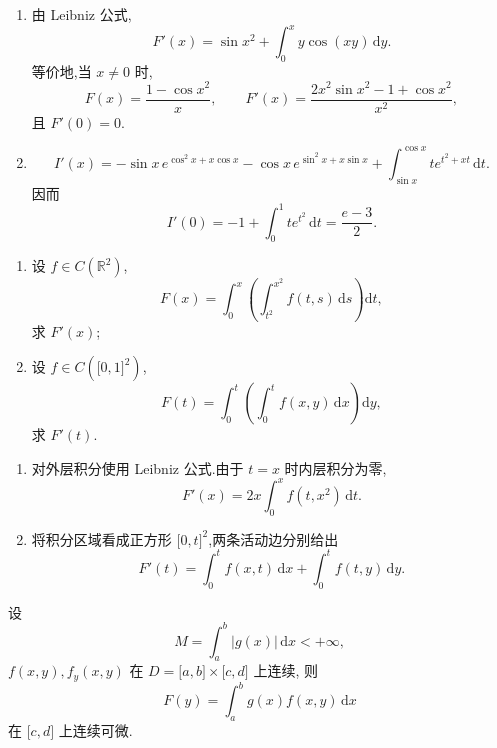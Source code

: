 \begin{solution}
    \begin{enumerate}
        \item 由 Leibniz 公式,
              \[
                  F'(x)=\sin x^2+\int_0^x y\cos(xy)\,\mathrm{d}y.
              \]
              等价地,当 $x\neq0$ 时,
              \[
                  F(x)=\dfrac{1-\cos x^2}{x},
                  \qquad
                  F'(x)=\dfrac{2x^2\sin x^2-1+\cos x^2}{x^2},
              \]
              且 $F'(0)=0$.
        \item
              \[
                  I'(x)=-\sin x\,e^{\cos^2x+x\cos x}
                  -\cos x\,e^{\sin^2x+x\sin x}
                  +\int_{\sin x}^{\cos x}t e^{t^2+xt}\,\mathrm{d}t.
              \]
              因而
              \[
                  I'(0)=-1+\int_0^1t e^{t^2}\,\mathrm{d}t
                  =\dfrac{e-3}{2}.
              \]
    \end{enumerate}
\end{solution}

\begin{example}
    \begin{enumerate}
        \item 设 $f\in C(\mathbb{R}^2)$,
              \[
                  F(x)=\int_0^x\left(\int_{t^2}^{x^2}f(t,s)\,\mathrm{d}s\right)\mathrm{d}t,
              \]
              求 $F'(x)$;
        \item 设 $f\in C(\lbrack0,1\rbrack^2)$,
              \[
                  F(t)=\int_0^t\left(\int_0^t f(x,y)\,\mathrm{d}x\right)\mathrm{d}y,
              \]
              求 $F'(t)$.
    \end{enumerate}
\end{example}
\exampleblank

\begin{solution}
    \begin{enumerate}
        \item 对外层积分使用 Leibniz 公式.由于 $t=x$ 时内层积分为零,
              \[
                  F'(x)=2x\int_0^x f(t,x^2)\,\mathrm{d}t.
              \]
        \item 将积分区域看成正方形 $\lbrack0,t\rbrack^2$,两条活动边分别给出
              \[
                  F'(t)=\int_0^t f(x,t)\,\mathrm{d}x
                  +\int_0^t f(t,y)\,\mathrm{d}y.
              \]
    \end{enumerate}
\end{solution}

\begin{example}
    设
    \[
        M=\int_a^b|g(x)|\,\mathrm{d}x<+\infty,
    \]
    $f(x,y),f_y(x,y)$ 在 $D=\lbrack a,b\rbrack\times\lbrack c,d\rbrack$ 上连续, 则
    \[
        F(y)=\int_a^b g(x)f(x,y)\,\mathrm{d}x
    \]
    在 $\lbrack c,d\rbrack$ 上连续可微.
\end{example}
\exampleblank

